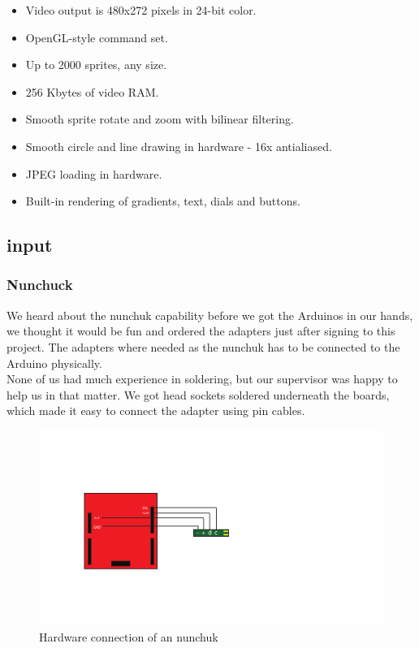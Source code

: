 \begin{itemize}
  \footnotesize
  \item Video output is 480x272 pixels in 24-bit color.
  \item OpenGL-style command set.
  \item Up to 2000 sprites, any size.
  \item 256 Kbytes of video RAM.
  \item Smooth sprite rotate and zoom with bilinear filtering.
  \item Smooth circle and line drawing in hardware - 16x antialiased.
  \item JPEG loading in hardware.
  \item Built-in rendering of gradients, text, dials and buttons.
\end{itemize}

\subsection{input}

\subsubsection{Nunchuck}%

We heard about the nunchuk capability before we got the Arduinos in our 
hands, we thought it would be fun and ordered the adapters just after signing
to this project. The adapters where needed as the nunchuk
has to be connected to the Arduino physically.
\\
None of us had much experience in soldering, but our supervisor was happy
to help us in that matter. We got head sockets soldered underneath
the boards, which made it easy to connect the adapter using pin cables.

\begin{figure}[h]
  \centering
  \includegraphics{Figures/NunchuckConnection}
  \caption{Hardware connection of an nunchuk}
  \label{fig:nunchuk_connect}
\end{figure}


